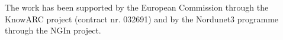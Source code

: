 \documentclass[final]{ieee}
\begin{document}
The work has been supported by the European Commission through the KnowARC
project (contract nr. 032691) and by the Nordunet3 programme through the NGIn
project.







\end{document}
